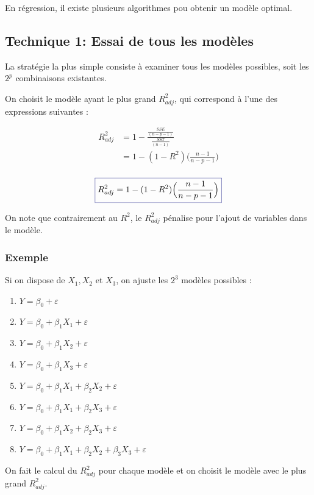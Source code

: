 \documentclass[11pt,french]{report}
\begin{document}
En régression, il existe plusieurs algorithmes pou obtenir un modèle optimal.

\subsection{Technique 1: Essai de tous les modèles}
\label{tech1}

La stratégie la plus simple consiste à examiner tous les modèles possibles, soit les $2^p$ combinaisons existantes. \newline

On choisit le modèle ayant le plus grand $R^2_{adj}$, qui correspond à l'une des expressions suivantes :


\begin{align*}
R^2_{adj} &= 1 - \frac{\frac{SSE}{(n-p-1)}}{\frac{SST}{(n-1)}} \\
&= 1 - (1 - R^2) \Big(\frac{n-1}{n-p-1} \Big) \\
\end{align*}


\begin{equation}
\color{Blue}
\boxed{\color{black}
R^2_{adj} = 1 - (1 - R^2) \Big(\frac{n-1}{n-p-1} \Big) 
}
\end{equation}

On note que contrairement au $R^2$, le $R^2_{adj}$ pénalise pour l'ajout de variables dans le modèle.

\bigskip
\subsubsection*{Exemple}
Si on dispose de $X_1, X_2$ et $X_3$, on ajuste les $2^3$ modèles possibles :
\begin{enumerate}
\item $Y = \beta_0 + \varepsilon$
\item $Y = \beta_0 + \beta_1X_1 + \varepsilon$
\item $Y = \beta_0 + \beta_1X_2 + \varepsilon$
\item $Y = \beta_0 + \beta_1X_3 + \varepsilon$
\item $Y = \beta_0 + \beta_1X_1 + \beta_2X_2 + \varepsilon$
\item $Y = \beta_0 + \beta_1X_1 + \beta_2X_3 + \varepsilon$
\item $Y = \beta_0 + \beta_1X_2 + \beta_2X_3 + \varepsilon$
\item $Y = \beta_0 + \beta_1X_1 + \beta_2X_2 + \beta_3X_3 + \varepsilon$
\end{enumerate}
\bigskip
On fait le calcul du $R^2_{adj}$ pour chaque modèle et on choisit le modèle avec le plus grand $R^2_{adj}$.
\end{document}
